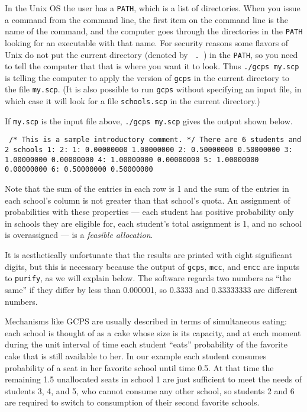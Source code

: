 \documentclass[12pt]{article}
\theoremstyle{definition}
\begin{document}
In the Unix OS the user has a \texttt{PATH}, which is a list of
directories.  When you issue a command from the command line, the
first item on the command line is the name of the command, and the
computer goes through the directories in the \texttt{PATH} looking for
an executable with that name.  For security reasons some flavors of
Unix do not put the current directory (denoted by \texttt{\ .\ }) in
the \texttt{PATH}, so you need to tell the computer that that is where
you want it to look.  Thus \texttt{./gcps my.scp} is telling the
computer to apply the version of \texttt{gcps} in the current
directory to the file \texttt{my.scp}.  (It is also possible to run
\texttt{gcps} without specifying an input file, in which case it will
look for a file \texttt{schools.scp} in the current directory.)

If \texttt{my.scp} is the input file above, \texttt{./gcps my.scp}
gives the output shown below.
\medskip
\begin{obeylines}\texttt{
/* This is a sample introductory comment. */
There are 6 students and 2 schools
          1:          2:
1:   0.00000000  1.00000000
2:   0.50000000  0.50000000
3:   1.00000000  0.00000000
4:   1.00000000  0.00000000
5:   1.00000000  0.00000000
6:   0.50000000  0.50000000
}
\end{obeylines} \noindent

\smallskip \noindent Note that the sum of the entries in each row is 1
and the sum of the entries in each school's column is not greater than
that school's quota.  An assignment of probabilities with these
properties --- each student has positive probability only in schools
they are eligible for, each student's total assignment is 1, and no
school is overassigned --- is a \emph{feasible allocation}.

It is aesthetically unfortunate that the results are printed with
eight significant digits, but this is necessary because the output of
\texttt{gcps}, \texttt{mcc}, and \texttt{emcc} are inputs to
\texttt{purify}, as we will explain below.  The software regards two
numbers as ``the same'' if they differ by less than 0.000001, so
0.3333 and 0.33333333 are different numbers.

Mechanisms like GCPS are usually described in terms of simultaneous
eating: each school is thought of as a cake whose size is its
capacity, and at each moment during the unit interval of time each
student ``eats'' probability of the favorite cake that is still
available to her.  In our example each student consumes probability of
a seat in her favorite school until time 0.5.  At that time the
remaining 1.5 unallocated seats in school 1 are just sufficient to
meet the needs of students 3, 4, and 5, who cannot consume any other
school, so students 2 and 6 are required to switch to consumption of
their second favorite schools.
\end{document}
